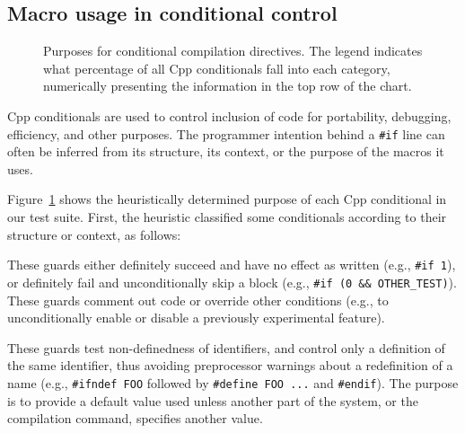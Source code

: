 \documentclass[10pt]{article}
\newcommand{\captionsmall}[1]{\caption[]{\small #1}}
\begin{document}


\subsection{Macro usage in conditional control}
\label{sec:ccd}

\begin{figure}
\centerline{}
\captionsmall{Purposes for conditional compilation directives.
  The legend indicates what percentage of all Cpp conditionals fall
  into each category, numerically presenting the information in the top row
  of the chart.}
\label{fig:ccd-categories}
\end{figure}

Cpp conditionals are used to control inclusion of code for portability,
debugging, efficiency, and other purposes.  The programmer intention behind
a {\tt \#if} line can often be inferred from its structure, its context, or
the purpose of the macros it uses.


Figure~\ref{fig:ccd-categories} shows the heuristically determined purpose
of each Cpp conditional in our test suite.  First, the heuristic classified
some conditionals according to their structure or context, as follows:
\begin{description}\itemsep 0pt \parskip 0pt
\item[Commenting] These guards either definitely succeed and
  have no effect as written (e.g., \texttt{\#if 1}), or definitely fail
  and unconditionally skip a block (e.g., {\tt \#if (0 \&\&
  \verb|OTHER_TEST|)}).  These guards comment out code or override other
  conditions (e.g., to unconditionally enable or disable a previously
  experimental feature).
      
\item[Redefinition suppression] These guards test non-definedness of
  identifiers, and control only a definition of the same identifier, thus avoiding
  preprocessor warnings about a redefinition of a name (e.g.,
  \texttt{\#ifndef FOO} followed by \texttt{\#define FOO ...} and
  \texttt{\#endif}).  
  The purpose is to provide a default value used unless another part of the
  system, or the compilation command, specifies another value.

\end{description}
\end{document}
